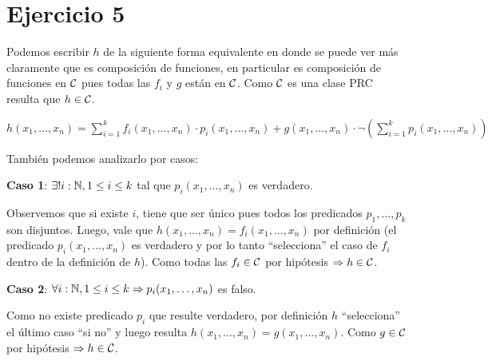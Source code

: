\section*{Ejercicio 5}

Podemos escribir $h$ de la siguiente forma equivalente en donde se puede ver más claramente que es composición de funciones, en particular es composición de funciones en $\mathcal{C}$ pues todas las $f_i$ y $g$ están en $\mathcal{C}$. Como $\mathcal{C}$ es una clase PRC resulta que $h \in \mathcal{C}$.

$h(x_1, \dots, x_n) = \sum_{i=1}^k f_i(x_1, \dots, x_n) \cdot p_i(x_1, \dots, x_n) + g(x_1, \dots, x_n) \cdot \neg (\sum_{i=1}^k p_i(x_1, \dots, x_n))$

También podemos analizarlo por casos:

\textbf{Caso 1}: $\exists! i: \mathbb{N}, 1 \leq i \leq k$ tal que $p_i(x_1, \dots, x_n)$ es verdadero.

Observemos que si existe $i$, tiene que ser único pues todos los predicados $p_1, \dots, p_k$ son disjuntos. Luego, vale que $h(x_1, \dots, x_n) = f_i(x_1, \dots, x_n)$ por definición (el predicado $p_i(x_1, \dots, x_n)$ es verdadero y por lo tanto ``selecciona'' el caso de $f_i$ dentro de la definición de $h$). Como todas las $f_i \in \mathcal{C}$ por hipótesis $\Rightarrow h \in \mathcal{C}$.

\textbf{Caso 2}: $\forall i: \mathbb{N}, 1 \leq i \leq k \Rightarrow p_i(x_1, \dots, x_n)$ es falso.

Como no existe predicado $p_i$ que resulte verdadero, por definición $h$ ``selecciona'' el último caso ``si no'' y luego resulta $h(x_1, \dots, x_n) = g(x_1, \dots, x_n)$. Como $g \in \mathcal{C}$ por hipótesis $\Rightarrow h \in \mathcal{C}$.
